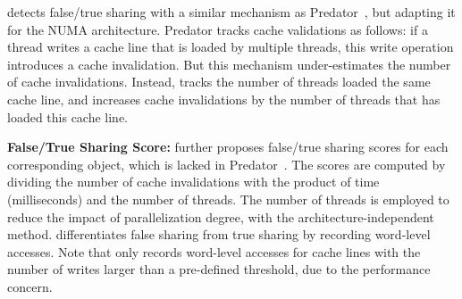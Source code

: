 \NP{} detects false/true sharing with a similar mechanism as Predator~\cite{Predator}, but adapting it for the NUMA architecture. Predator tracks cache validations as follows: if a thread writes a cache line that is loaded by multiple threads, this write operation introduces a cache invalidation. But this mechanism under-estimates the number of cache invalidations. 
Instead, \NP{} tracks the number of threads  loaded the same cache line, and increases cache invalidations by the number of threads that has loaded this cache line. %

\textbf{False/True Sharing Score:} 
\NP{} further proposes false/true sharing scores for each corresponding object, which is lacked in Predator~\cite{Predator}. The scores are computed by dividing the number of cache invalidations with the product of time (milliseconds) and the number of threads. The number of threads is employed to reduce the impact of parallelization degree, with the architecture-independent method.  
\NP{}  differentiates false sharing from true sharing by recording word-level accesses. 
Note that \NP{} only records word-level accesses for cache lines with the number of writes larger than a pre-defined threshold, due to the performance concern. 



